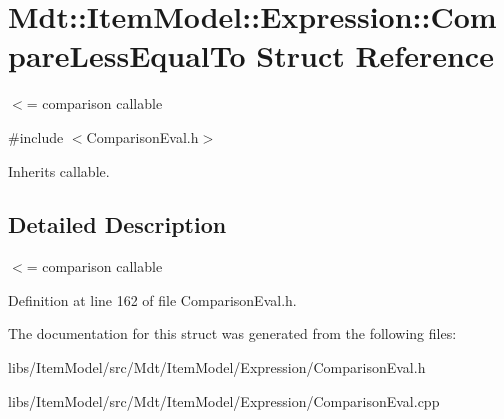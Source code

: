\hypertarget{struct_mdt_1_1_item_model_1_1_expression_1_1_compare_less_equal_to}{}\section{Mdt\+:\+:Item\+Model\+:\+:Expression\+:\+:Compare\+Less\+Equal\+To Struct Reference}
\label{struct_mdt_1_1_item_model_1_1_expression_1_1_compare_less_equal_to}


$<$= comparison callable  




{\ttfamily \#include $<$Comparison\+Eval.\+h$>$}



Inherits callable.



\subsection{Detailed Description}
$<$= comparison callable 

Definition at line 162 of file Comparison\+Eval.\+h.



The documentation for this struct was generated from the following files\+:\begin{DoxyCompactItemize}
\item 
libs/\+Item\+Model/src/\+Mdt/\+Item\+Model/\+Expression/Comparison\+Eval.\+h\item 
libs/\+Item\+Model/src/\+Mdt/\+Item\+Model/\+Expression/Comparison\+Eval.\+cpp\end{DoxyCompactItemize}
